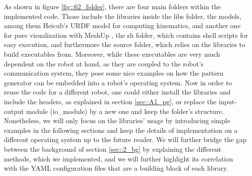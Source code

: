 As shown in figure \ref{fig::62_folder}, there are four main folders within the implemented code. Those include the libraries inside the libs folder, the models, among them Heicub's URDF model for computing kinematics, and another one for pure visualization with MeshUp \cite{meshup}, the sh folder, which contains shell scripts for easy execution, and furthermore the source folder, which relies on the libraries to build executables from. Moreover, while these executables are very much dependent on the robot at hand, as they are coupled to the robot's communication system, they pose some nice examples on how the pattern generator can be embedded into a robot's operating system. Now in order to reuse the code for a different robot, one could either install the libraries and include the headers, as explained in section \ref{sec::A1_pg}, or replace the input-output module (io\_module) by a new one and keep the folder's structure. Nonetheless, we will only focus on the libraries' usage by introducing simple examples in the following sections and keep the details of implementation on a different operating system up to the future reader. We will further bridge the gap between the background of section \ref{sec::2_bg} by explaining the different methods, which we implemented, and we will further highlight its correlation with the YAML \cite{ben2005yaml} configuration files that are a building block of each library. 
